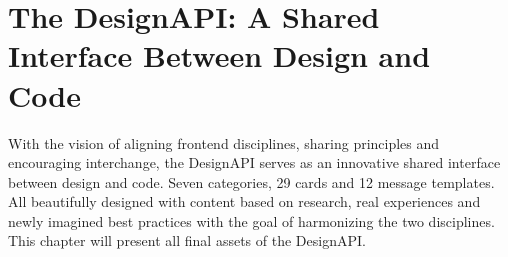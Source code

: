 \newpage
\section{The DesignAPI: A Shared Interface Between Design and Code}
With the vision of aligning frontend disciplines, sharing principles and encouraging interchange,
the DesignAPI serves as an innovative shared interface between design and code. Seven categories, 29
cards and 12 message templates. All beautifully designed with content based on research, real
experiences and newly imagined best practices with the goal of harmonizing the two disciplines. This
chapter will present all final assets of the DesignAPI.







